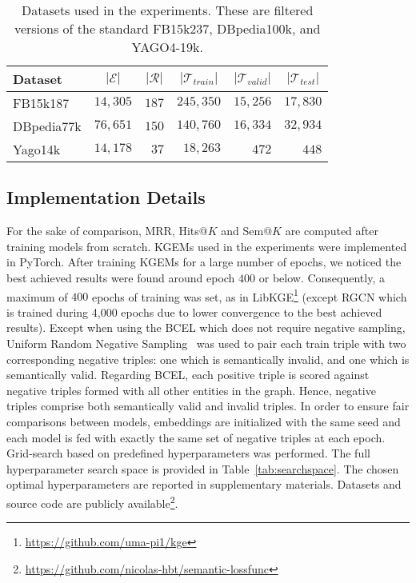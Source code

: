 \documentclass[letterpaper]{article} %
\begin{document}
\begin{table}
\small
\centering
\caption{Datasets used in the experiments. These are filtered versions of the standard FB15k237, DBpedia100k, and YAGO4-19k.}\label{tab:datasets}
\begin{tabular}{lrrrrr}
\hline 
Dataset & \multicolumn{1}{c}{$|\mathcal{E}|$} & \multicolumn{1}{c}{$|\mathcal{R}|$} & \multicolumn{1}{c}{$|\mathcal{T}_{train}|$} & \multicolumn{1}{c}{$|\mathcal{T}_{valid}|$} & \multicolumn{1}{c}{$|\mathcal{T}_{test}|$}\\
\hline 
FB15k187 & $14,305$ & $187$ & $245,350$ & $15,256$ & $17,830$ \\
DBpedia77k  & $76,651$ & $150$ & $140,760$ & $16,334$ & $32,934$ \\
Yago14k & $14,178$ & $37$ & $18,263$ & $472$ & $448$  \\
\hline 
\end{tabular}
\end{table}

\subsection{Implementation Details}\label{implementation}
For the sake of comparison, MRR, Hits@$K$ and Sem@$K$ are computed after training models from scratch.
KGEMs used in the experiments were implemented in PyTorch. After training KGEMs for a large number of epochs, we noticed the best achieved results were found around epoch $400$ or below. Consequently, a maximum of $400$ epochs of training was set, as in LibKGE\footnote{\url{https://github.com/uma-pi1/kge}} (except RGCN which is trained during 4,000 epochs due to lower convergence to the best achieved results).
Except when using the BCEL which does not require negative sampling, Uniform Random Negative Sampling~\cite{transe} was used to pair each train triple with two corresponding negative triples: one which is semantically invalid, and one which is semantically valid. 
Regarding BCEL, each positive triple is scored against negative triples formed with all other entities in the graph. 
Hence, negative triples comprise both semantically valid and invalid triples.
In order to ensure fair comparisons between models, embeddings are initialized with the same seed and each model is fed with exactly the same set of negative triples at each epoch.
Grid-search based on predefined hyperparameters was performed. The full hyperparameter search space is provided in Table~\ref{tab:searchspace}. The chosen optimal hyperparameters are reported in supplementary materials. Datasets and source code are publicly available\footnote{\url{https://github.com/nicolas-hbt/semantic-lossfunc}}.
\end{document}
